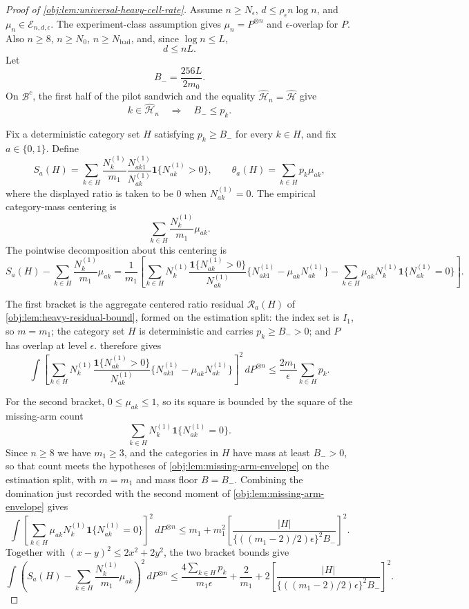 \documentclass[11pt]{article}
\begin{document}
\begin{proof}[Proof of \cref{obj:lem:universal-heavy-cell-rate}]
Assume \(n\ge N_\epsilon\), \(d\le \rho_\epsilon n\log n\), and
\(\mu_n\in\mathcal E_{n,d,\epsilon}\). The experiment-class assumption gives
\(\mu_n=P^{\otimes n}\) and \(\epsilon\)-overlap for \(P\). Also
\(n\ge8\), \(n\ge N_0\), \(n\ge N_{\mathrm{bad}}\), and, since \(\log n\le L\),
\[
d\le nL.
\]
Let
\[
B_- = \frac{256L}{2m_0}.
\]
On \(\mathcal B^c\), the first half of the pilot sandwich and the equality
\(\widehat{\mathcal H}_n=\widehat{\mathcal H}\) give
\[
k\in\widehat{\mathcal H}_n
\quad\Longrightarrow\quad
B_-\le p_k .
\] %

Fix a deterministic category set \(H\) satisfying \(p_k\ge B_-\) for every \(k\in H\), and fix
\(a\in\{0,1\}\). Define
\[
S_a(H)
=
\sum_{k\in H}
\frac{N_k^{(1)}}{m_1}
\frac{N_{ak1}^{(1)}}{N_{ak}^{(1)}}
\mathbf 1\{N_{ak}^{(1)}>0\},
\qquad
\theta_a(H)=\sum_{k\in H}p_k\mu_{ak},
\]
where the displayed ratio is taken to be \(0\) when \(N_{ak}^{(1)}=0\). The empirical
category-mass centering is
\[
\sum_{k\in H}\frac{N_k^{(1)}}{m_1}\mu_{ak}.
\]
The pointwise decomposition about this centering is
\[
S_a(H)-\sum_{k\in H}\frac{N_k^{(1)}}{m_1}\mu_{ak}
=
\frac1{m_1}
\left[
\sum_{k\in H}
N_k^{(1)}\frac{\mathbf 1\{N_{ak}^{(1)}>0\}}{N_{ak}^{(1)}}
\{N_{ak1}^{(1)}-\mu_{ak}N_{ak}^{(1)}\}
-
\sum_{k\in H}\mu_{ak}N_k^{(1)}\mathbf 1\{N_{ak}^{(1)}=0\}
\right].
\] %

The first bracket is the aggregate centered ratio residual \(\mathcal R_a(H)\) of
\cref{obj:lem:heavy-residual-bound}, formed on the estimation split: the index set is \(I_1\),
so \(m=m_1\); the category set \(H\) is deterministic and carries \(p_k\ge B_->0\); and \(P\)
has overlap at level \(\epsilon\).  therefore gives
\[
\int
\left[
\sum_{k\in H}
N_k^{(1)}\frac{\mathbf 1\{N_{ak}^{(1)}>0\}}{N_{ak}^{(1)}}
\{N_{ak1}^{(1)}-\mu_{ak}N_{ak}^{(1)}\}
\right]^2
\,dP^{\otimes n}
\le
\frac{2m_1}{\epsilon}\sum_{k\in H}p_k .
\] %

For the second bracket, \(0\le\mu_{ak}\le1\), so its square is bounded by the square of the
missing-arm count
\[
\sum_{k\in H}N_k^{(1)}\mathbf 1\{N_{ak}^{(1)}=0\}.
\]
Since \(n\ge8\) we have \(m_1\ge3\), and the categories in \(H\) have mass at least \(B_->0\), so
that count meets the hypotheses of \cref{obj:lem:missing-arm-envelope} on the estimation split,
with \(m=m_1\) and mass floor \(B=B_-\). Combining the domination just recorded with the second
moment of \cref{obj:lem:missing-arm-envelope} gives
\[
\int
\left[
\sum_{k\in H}\mu_{ak}N_k^{(1)}\mathbf 1\{N_{ak}^{(1)}=0\}
\right]^2
\,dP^{\otimes n}
\le
m_1+m_1^2
\left[
\frac{|H|}
{\{((m_1-2)/2)\epsilon\}^2 B_-}
\right]^2 .
\] %
Together with \((x-y)^2\le2x^2+2y^2\), the two bracket bounds give
\[
\int
\left(
S_a(H)-\sum_{k\in H}\frac{N_k^{(1)}}{m_1}\mu_{ak}
\right)^2
\,dP^{\otimes n}
\le
\frac{4\sum_{k\in H}p_k}{m_1\epsilon}
+
\frac2{m_1}
+
2\left[
\frac{|H|}
{\{((m_1-2)/2)\epsilon\}^2 B_-}
\right]^2 .
\] %


\end{proof}
\end{document}
